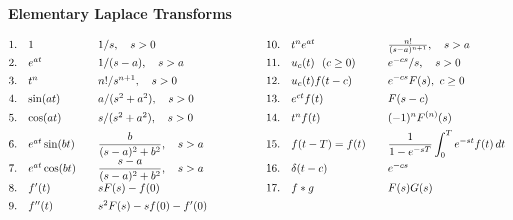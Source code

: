 \def\dm{\displaystyle}

\begin{center}
    {\bf Elementary Laplace Transforms}\\[2pt]
\end{center}
$
\hspace*{-.5em}
\begin{array}{lllllll}
 1.  & 1 \quad  & 1/s,\quad s>0 & \qquad  \ \quad & 10.  & t^n e^{at}\  \quad  & \frac{n!}{(s-a)^{n+1}},\quad s>a\\[1ex] 
 2.  & e^{at} \quad  & 1/(s-a),\quad s>a  & \qquad  \ \quad & 11. & u_c(t)\ \ (c\ge 0) \quad  & e^{-cs}/s,\quad s>0 \\[1ex]
 3.  & t^n  \quad  & n!/s^{n+1},\quad s>0 & \qquad  \ \quad & 12.  & u_c(t)f(t-c)\  \quad  & \dm e^{-cs} F(s), \ c\ge 0 \\[1ex] 
 4.  & \sin(at) \quad  & a/(s^2+a^2),\quad s>0  & \qquad  \ \quad & 13.  & e^{ct}f(t) \quad  & \dm F(s-c) \\[1ex] 
 5.  & \cos(at) \quad  & s/(s^2+a^2),\quad s>0  & \qquad  \ \quad & 14.  & t^n f(t) \quad  & \dm (-1)^n F^{(n)}(s) \\[1ex]
 6.  & e^{at}\sin(bt) \quad  & \dm\frac{b}{(s-a)^2+b^2},\quad s>a  & \qquad  \ \quad & 15. & f(t-T) = f(t) \quad  & \dm \frac{1}{1-e^{-sT}}\int_0^Te^{-st}f(t)\,dt \\[1ex]
 7.  & e^{at}\cos(bt) \quad  & \dm\frac{s-a}{(s-a)^2+b^2},\quad s>a & \qquad  \ \quad &  16. & \delta(t-c) & e^{-cs}\\[1ex]
 8.  & f'(t) \  \quad  &  sF(s) - f(0) & \qquad  \ \quad & 17. & f\ast g & F(s)G(s) \\[1ex]
 9.  & f''(t) \  \quad   & s^2F(s) - sf(0) - f'(0) & \qquad  \ \quad &  & & \\[1ex]
\end{array} 
$